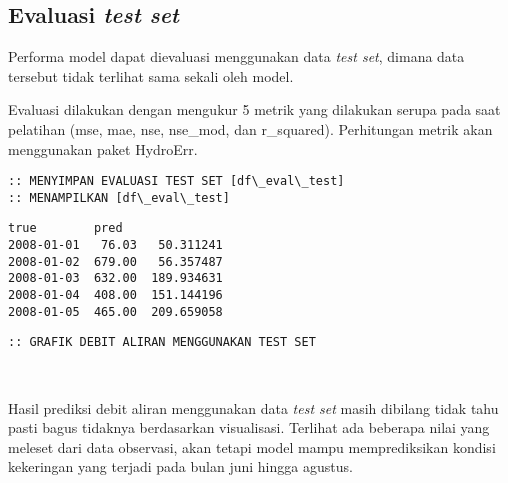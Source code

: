 \documentclass[11pt]{article}
\makeatletter
\newcommand{\boxspacing}{\kern\kvtcb@left@rule\kern\kvtcb@boxsep}
\newcommand{\prompt}[4]{
        \ttfamily\llap{{\color{#2}[#3]:\hspace{3pt}#4}}\vspace{-\baselineskip}
    }
\makeatother
\begin{document}
    \hypertarget{evaluasi-test-set}{%
\subsection{\texorpdfstring{Evaluasi \emph{test
set}}{Evaluasi test set}}\label{evaluasi-test-set}}

Performa model dapat dievaluasi menggunakan data \emph{test set}, dimana
data tersebut tidak terlihat sama sekali oleh model.

Evaluasi dilakukan dengan mengukur 5 metrik yang dilakukan serupa pada
saat pelatihan (mse, mae, nse, nse\_mod, dan r\_squared). Perhitungan
metrik akan menggunakan paket HydroErr.

    \begin{Verbatim}[commandchars=\\\{\}]
:: MENYIMPAN EVALUASI TEST SET [df\_eval\_test]
:: MENAMPILKAN [df\_eval\_test]
    \end{Verbatim}

            \begin{tcolorbox}[breakable, size=fbox, boxrule=.5pt, pad at break*=1mm, opacityfill=0]
\prompt{Out}{outcolor}{62}{\boxspacing}
\begin{Verbatim}[commandchars=\\\{\}]
              true        pred
2008-01-01   76.03   50.311241
2008-01-02  679.00   56.357487
2008-01-03  632.00  189.934631
2008-01-04  408.00  151.144196
2008-01-05  465.00  209.659058
\end{Verbatim}
\end{tcolorbox}
        
    \begin{Verbatim}[commandchars=\\\{\}]
:: GRAFIK DEBIT ALIRAN MENGGUNAKAN TEST SET
    \end{Verbatim}

    \begin{center}
    \end{center}
    { \hspace*{\fill} \\}
    
    Hasil prediksi debit aliran menggunakan data \emph{test set} masih
dibilang tidak tahu pasti bagus tidaknya berdasarkan visualisasi.
Terlihat ada beberapa nilai yang meleset dari data observasi, akan
tetapi model mampu memprediksikan kondisi kekeringan yang terjadi pada
bulan juni hingga agustus.
\end{document}
